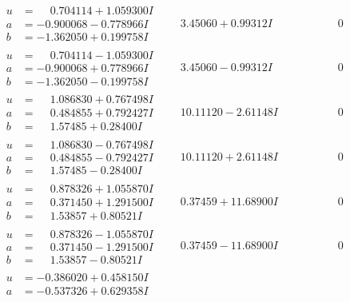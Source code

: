 \documentclass[1p]{elsarticle_modified}
\theoremstyle{definition}
\begin{document}
$$\begin{array}{c|c|c}
\begin{aligned}
u &= \phantom{-}0.704114 + 1.059300 I \\
a &= -0.900068 - 0.778966 I \\
b &= -1.362050 + 0.199758 I\end{aligned}
 & \phantom{-}3.45060 + 0.99312 I & \phantom{-0.000000 } 0 \\ \hline\begin{aligned}
u &= \phantom{-}0.704114 - 1.059300 I \\
a &= -0.900068 + 0.778966 I \\
b &= -1.362050 - 0.199758 I\end{aligned}
 & \phantom{-}3.45060 - 0.99312 I & \phantom{-0.000000 } 0 \\ \hline\begin{aligned}
u &= \phantom{-}1.086830 + 0.767498 I \\
a &= \phantom{-}0.484855 + 0.792427 I \\
b &= \phantom{-}1.57485 + 0.28400 I\end{aligned}
 & \phantom{-}10.11120 - 2.61148 I & \phantom{-0.000000 } 0 \\ \hline\begin{aligned}
u &= \phantom{-}1.086830 - 0.767498 I \\
a &= \phantom{-}0.484855 - 0.792427 I \\
b &= \phantom{-}1.57485 - 0.28400 I\end{aligned}
 & \phantom{-}10.11120 + 2.61148 I & \phantom{-0.000000 } 0 \\ \hline\begin{aligned}
u &= \phantom{-}0.878326 + 1.055870 I \\
a &= \phantom{-}0.371450 + 1.291500 I \\
b &= \phantom{-}1.53857 + 0.80521 I\end{aligned}
 & \phantom{-}0.37459 + 11.68900 I & \phantom{-0.000000 } 0 \\ \hline\begin{aligned}
u &= \phantom{-}0.878326 - 1.055870 I \\
a &= \phantom{-}0.371450 - 1.291500 I \\
b &= \phantom{-}1.53857 - 0.80521 I\end{aligned}
 & \phantom{-}0.37459 - 11.68900 I & \phantom{-0.000000 } 0 \\ \hline\begin{aligned}
u &= -0.386020 + 0.458150 I \\
a &= -0.537326 + 0.629358 I \\

\end{aligned}
\end{array}$$
\end{document}
